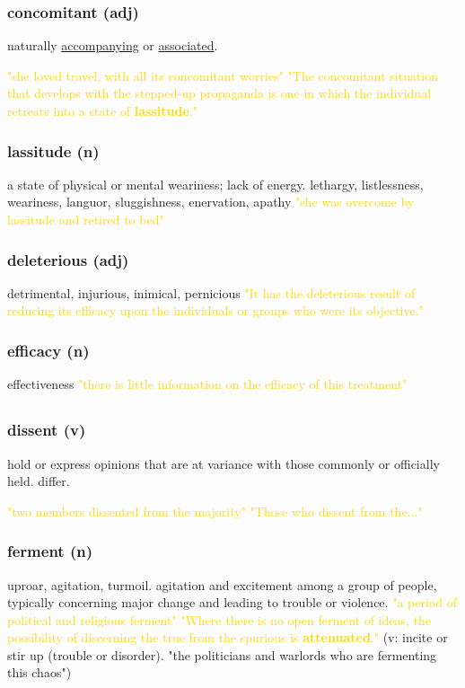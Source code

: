 \documentclass{proc}
\begin{document}
	\subsubsection{\textcolor{brickred}{concomitant} (adj)}
	naturally \underline{accompanying} or \underline{associated}.
	
	\textcolor{gold}{"she loved travel, with all its concomitant worries" "The concomitant situation that develops with the stepped-up propaganda is one in which the individual retreats into a state of \textbf{lassitude}."}
	
	\subsubsection{\textcolor{brickred}{lassitude} (n)}
	a state of physical or mental weariness; lack of energy. lethargy,
	listlessness,
	weariness,
	languor,
	sluggishness,
	enervation,
	apathy
	\textcolor{gold}{"she was overcome by lassitude and retired to bed"}
	
	\subsubsection{\textcolor{brickred}{deleterious} (adj)}
	detrimental,
	injurious,
	inimical,
	pernicious
	\textcolor{gold}{ "It has the deleterious result  of reducing its efficacy upon the individuals or groups who were its objective."}
	
	\subsubsection{\textcolor{brickred}{efficacy} (n)}
	effectiveness
	\textcolor{gold}{"there is little information on the efficacy of this treatment"}
	
	\newpage
	\subsection{}
	\subsubsection{\textcolor{brickred}{dissent} (v)}
	hold or express opinions that are at variance with those commonly or officially held. differ.
	
	\textcolor{gold}{"two members dissented from the majority" "Those who dissent from the..."}
	
	\subsubsection{\textcolor{brickred}{ferment} (n)}
	uproar, agitation, turmoil. agitation and excitement among a group of people, typically concerning major change and leading to trouble or violence.
	\textcolor{gold}{"a period of political and religious ferment" "Where there is no open ferment of ideas, the possibility of discerning the true from the spurious is \textbf{attenuated}."}
	(v: incite or stir up (trouble or disorder).
	"the politicians and warlords who are fermenting this chaos")
	
\end{document}
